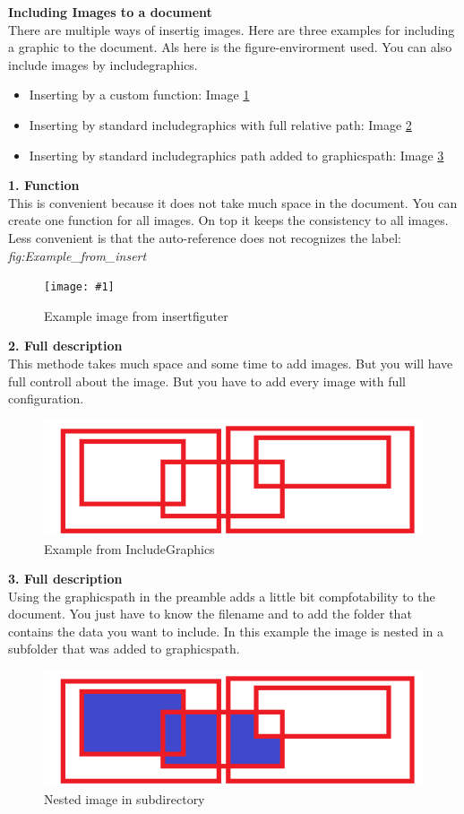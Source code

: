 \documentclass{article}
\newcommand{\insertfigure}[4]{
  \begin{figure}[H]
    \centering
    \texttt{[image: \#1]}
    \caption{#3}
    \label{#4}
  \end{figure}
}
\begin{document}
\textbf{Including Images to a document}\\

There are multiple ways of insertig images. Here are three examples for including a graphic to the document. Als here is the figure-envirorment used. You can also include images by includegraphics. 
\begin{itemize}
\item[1] Inserting by a custom function: Image \ref{fig:Example_from_insert}
\item[2] Inserting by standard includegraphics with full relative path: Image \ref{fig:Example_from_include}
\item[3] Inserting by standard includegraphics path added to graphicspath: Image \ref{fig:Nested_Image}
\end{itemize}

\textbf{1. Function}\\
This is convenient because it does not take much space in the document. You can create one function for all images. On top it keeps the consistency to all images. Less convenient is that the auto-reference does not recognizes the label: \textit{fig:Example\_from\_insert}
\insertfigure{pic/example.png}{1.0\textwidth}{Example image from insertfiguter}{fig:Example_from_insert}

\textbf{2. Full description}\\
This methode takes much space and some time to add images. But you will have full controll about the image. But you have to add every image with full configuration. 
\begin{figure}[H]
  \centering
    \includegraphics[width=1.0\textwidth]{pic/example.png}
    \caption{Example from IncludeGraphics}
    \label{fig:Example_from_include}
\end{figure}


\textbf{3. Full description}\\
Using the graphicspath in the preamble adds a little bit compfotability to the document. You just have to know the filename and to add the folder that contains the data you want to include. In this example the image is nested in a subfolder that was added to graphicspath. 
\begin{figure}[h]
\centering
\includegraphics[width=1\textwidth]{nastyExample.png}
\caption{Nested image in subdirectory}
\label{fig:Nested_Image}
\end{figure}
\end{document}
